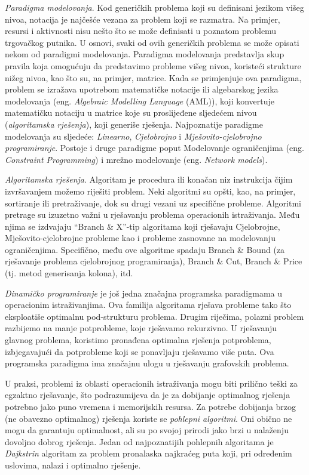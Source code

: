 \documentclass[a4paper, utf8, 11pt, colorlinks]{book}
\theoremstyle{definition}
\begin{document}
\emph{Paradigma modelovanja}. Kod generičkih problema koji su definisani jezikom višeg nivoa, notacija je najčešće vezana za problem koji se razmatra.
Na primjer, resursi i aktivnosti nisu nešto što se može definisati u poznatom problemu trgovačkog putnika. U osnovi, svaki od ovih generičkih problema se može opisati nekom od paradigmi modelovanja. Paradigma modelovanja predstavlja skup pravila koja omogućuju da predstavimo probleme višeg nivoa, koristeći strukture nižeg nivoa, kao što su, na primjer, matrice. Kada se primjenjuje ova paradigma, problem se izražava upotrebom matematičke notacije ili algebarskog jezika modelovanja (eng. \emph{Algebraic Modelling Language} (AML)), koji konvertuje matematičku notaciju u matrice koje su proslijeđene sljedećem nivou (\emph{algoritamska rješenja}), koji generiše rješenja. Najpoznatije paradigme modelovanja su sljedeće: \textit{Linearno}, \textit{Cjelobrojno} i \textit{Mješovito-cjelobrojno programiranje}. Postoje i druge paradigme poput Modelovanje ograničenjima (eng. \emph{Constraint Programming}) i mrežno modelovanje (eng. \emph{Network models}). 

\emph{Algoritamska rješenja}. Algoritam je procedura ili konačan niz instrukcija čijim izvršavanjem možemo riješiti problem. Neki algoritmi su opšti, kao, na primjer, sortiranje ili pretraživanje,  dok su drugi vezani uz specifične probleme. Algoritmi pretrage su izuzetno važni u rješavanju problema operacionih istraživanja. Među njima se izdvajaju ``Branch \& X''-tip algoritama koji rješavaju Cjelobrojne, Mješovito-cjelobrojne probleme kao i probleme zasnovane na modelovanju ograničenjima. Specifično, među ove algoritme spadaju Branch \& Bound (za rješavanje problema cjelobrojnog programiranja), Branch \& Cut, Branch \& Price (tj. metod generisanja kolona), itd.

\emph{Dinamičko programiranje} je još jedna značajna programska paradigmama  u operacionim istraživanjima. Ova familija algoritama rješava probleme tako što eksploatiše optimalnu pod-strukturu problema. Drugim riječima, polazni problem razbijemo na manje potprobleme, koje rješavamo rekurzivno. U rješavanju glavnog problema, koristimo pronađena optimalna rješenja potproblema, izbjegavajući da potprobleme koji se ponavljaju rješavamo više puta. Ova programska paradigma ima značajnu ulogu u rješavanju grafovskih problema. 

U praksi, problemi iz oblasti operacionih istraživanja mogu biti prilično teški za egzaktno rješavanje, što podrazumijeva da je za dobijanje optimalnog rješenja potrebno jako puno vremena i memorijskih resursa. Za potrebe dobijanja brzog (ne obavezno optimalnog) rješenja  koriste se \emph{pohlepni algoritmi}. Oni obično ne mogu 
da garantuju optimalnost, ali su   po svojoj prirodi jako brzi u nalaženju dovoljno dobrog rješenja. Jedan od najpoznatijih pohlepnih algoritama je \emph{Dajkstrin} algoritam za problem pronalaska najkraćeg puta koji, pri određenim uslovima, nalazi i optimalno rješenje. 
\end{document}
